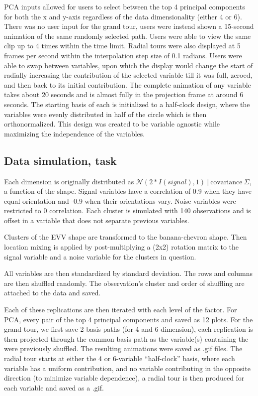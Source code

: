 \documentclass{template/monashthesis}
\begin{document}
PCA inputs allowed for users to select between the top 4 principal components for both the x and y-axis regardless of the data dimensionality (either 4 or 6). There was no user input for the grand tour, users were instead shown a 15-second animation of the same randomly selected path. Users were able to view the same clip up to 4 times within the time limit. Radial tours were also displayed at 5 frames per second within the interpolation step size of 0.1 radians. Users were able to swap between variables, upon which the display would change the start of radially increasing the contribution of the selected variable till it was full, zeroed, and then back to its initial contribution. The complete animation of any variable takes about 20 seconds and is almost fully in the projection frame at around 6 seconds. The starting basis of each is initialized to a half-clock design, where the variables were evenly distributed in half of the circle which is then orthonormalized. This design was created to be variable agnostic while maximizing the independence of the variables.

\hypertarget{data-simulation-task}{%
\subsection{Data simulation, task}\label{data-simulation-task}}

Each dimension is originally distributed as \(\mathcal{N}(2 * I(signal), 1)~|~\text{covariance}~\Sigma\), a function of the shape. Signal variables have a correlation of 0.9 when they have equal orientation and -0.9 when their orientations vary. Noise variables were restricted to 0 correlation. Each cluster is simulated with 140 observations and is offset in a variable that does not separate previous variables.

Clusters of the EVV shape are transformed to the banana-chevron shape. Then location mixing is applied by post-multiplying a (2x2) rotation matrix to the signal variable and a noise variable for the clusters in question.

All variables are then standardized by standard deviation. The rows and columns are then shuffled randomly. The observation's cluster and order of shuffling are attached to the data and saved.

Each of these replications are then iterated with each level of the factor. For PCA, every pair of the top 4 principal components and saved as 12 plots. For the grand tour, we first save 2 basis paths (for 4 and 6 dimension), each replication is then projected through the common basis path as the variable(s) containing the were previously shuffled. The resulting animations were saved as .gif files. The radial tour starts at either the 4 or 6-variable ``half-clock'' basis, where each variable has a uniform contribution, and no variable contributing in the opposite direction (to minimize variable dependence), a radial tour is then produced for each variable and saved as a .gif.
\end{document}
